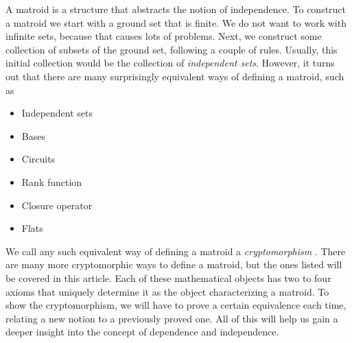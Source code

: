 A matroid is a structure that abstracts the notion of independence. To construct a matroid we start with a ground set that is finite. We do not want to work with infinite sets, because that causes lots of problems. Next, we construct some collection of subsets of the ground set, following a couple of rules. Usually, this initial collection would be the collection of \textit{independent sets}. However, it turns out that there are many surprisingly equivalent ways of defining a matroid, such as
\begin{itemize}
    \item Independent sets
    \item Bases
    \item Circuits
    \item Rank function
    \item Closure operator
    \item Flats
\end{itemize}

We call any such equivalent way of defining a matroid a \textit{cryptomorphism} \cite{gordon_mcnulty_2012}.
There are many more cryptomorphic ways to define a matroid, but the ones listed will be covered in this article. Each of these mathematical objects has two to four axioms that uniquely determine it as the object characterizing a matroid. To show the cryptomorphism, we will have to prove a certain equivalence each time, relating a new notion to a previously proved one. All of this will help us gain a deeper insight into the concept of dependence and independence.